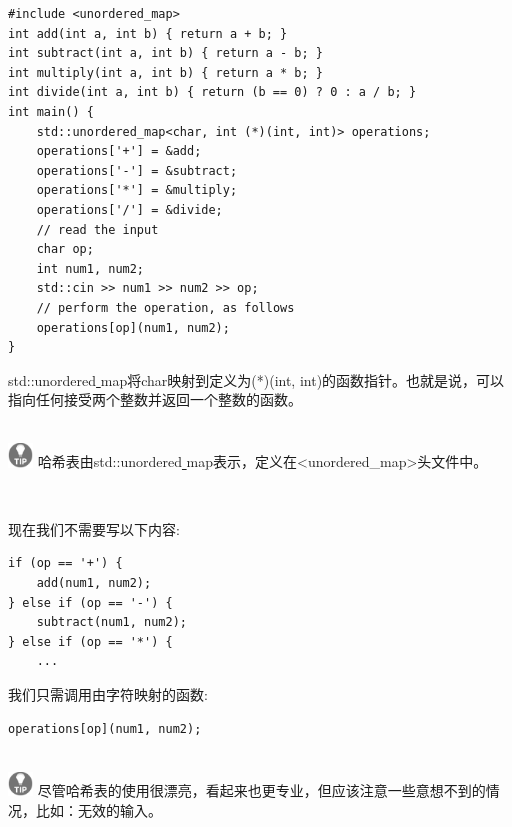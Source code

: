 \begin{lstlisting}[caption={}]
#include <unordered_map>
int add(int a, int b) { return a + b; }
int subtract(int a, int b) { return a - b; }
int multiply(int a, int b) { return a * b; }
int divide(int a, int b) { return (b == 0) ? 0 : a / b; }
int main() {
	std::unordered_map<char, int (*)(int, int)> operations;
	operations['+'] = &add;
	operations['-'] = &subtract;
	operations['*'] = &multiply;
	operations['/'] = &divide;
	// read the input
	char op;
	int num1, num2;
	std::cin >> num1 >> num2 >> op;
	// perform the operation, as follows
	operations[op](num1, num2);
}
\end{lstlisting}

std::unordered\underline{ }map将char映射到定义为(*)(int, int)的函数指针。也就是说，可以指向任何接受两个整数并返回一个整数的函数。 \par

\hspace*{\fill} \\ %
\includegraphics[width=0.05\textwidth]{images/tip}
哈希表由std::unordered\underline{ }map表示，定义在<unordered\_map>头文件中。\par
\noindent\textbf{}\ \par

现在我们不需要写以下内容: \par

\begin{lstlisting}[caption={}]
if (op == '+') {
	add(num1, num2);
} else if (op == '-') {
	subtract(num1, num2);
} else if (op == '*') {
	...
\end{lstlisting}

我们只需调用由字符映射的函数: \par

\begin{lstlisting}[caption={}]
operations[op](num1, num2);
\end{lstlisting}

\hspace*{\fill} \\ %
\includegraphics[width=0.05\textwidth]{images/tip}
尽管哈希表的使用很漂亮，看起来也更专业，但应该注意一些意想不到的情况，比如：无效的输入。 \par
\noindent\textbf{}\ \par

